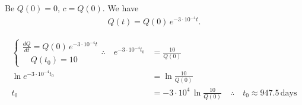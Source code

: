 \begin{solution}
\begin{solparts}
		\item
		Be $Q(0)=0$, $c=Q(0)$. We have
		\begin{gather*}
			\boxed{Q(t)=Q(0)\, e^{-3\cdot 10^{-4}t}}.
		\end{gather*}
	
		\item
		\begin{align*}
			\begin{cases}
				\frac{dQ}{dt}=Q(0)\, e^{-3\cdot 10^{-4}t}\\
				\quad Q(t_0)=10
			\end{cases}
			\therefore \quad
			e^{-3\cdot 10^{-4}t_0}&=\frac{10}{Q(0)}\\
			\ln e^{-3\cdot 10^{-4}t_0}&=\ln \frac{10}{Q(0)}\\
			t_0&=-3\cdot 10^{4}\,\ln \frac{10}{Q(0)} \quad \therefore \quad \boxed{t_0\approx 947.5\, \text{days}}
		\end{align*}
	\end{solparts}
\end{solution}

